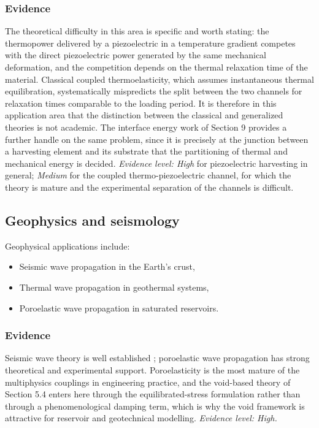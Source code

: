 \subsubsection{Evidence}
The theoretical difficulty in this area is specific and worth stating: the thermopower delivered by a piezoelectric in a temperature gradient competes with the direct piezoelectric power generated by the same mechanical deformation, and the competition depends on the thermal relaxation time of the material. Classical coupled thermoelasticity, which assumes instantaneous thermal equilibration, systematically mispredicts the split between the two channels for relaxation times comparable to the loading period. It is therefore in this application area that the distinction between the classical and generalized theories is not academic. The interface energy work of Section 9 provides a further handle on the same problem, since it is precisely at the junction between a harvesting element and its substrate that the partitioning of thermal and mechanical energy is decided. \emph{Evidence level: High} for piezoelectric harvesting in general; \emph{Medium} for the coupled thermo-piezoelectric channel, for which the theory is mature and the experimental separation of the channels is difficult.

\subsection{Geophysics and seismology}
\label{sec:13.4}

Geophysical applications include:
\begin{itemize}
\item Seismic wave propagation in the Earth's crust,
\item Thermal wave propagation in geothermal systems,
\item Poroelastic wave propagation in saturated reservoirs.
\end{itemize}

\subsubsection{Evidence}
Seismic wave theory is well established \cite{Achenbach1973}; poroelastic wave propagation has strong theoretical and experimental support. Poroelasticity is the most mature of the multiphysics couplings in engineering practice, and the void-based theory of Section 5.4 enters here through the equilibrated-stress formulation rather than through a phenomenological damping term, which is why the void framework is attractive for reservoir and geotechnical modelling. \emph{Evidence level: High.}

